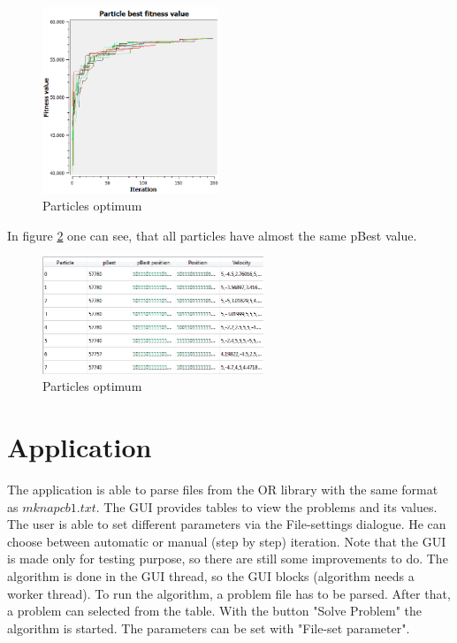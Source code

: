 \documentclass{article}
\begin{document}
\begin{figure}[H]
    \centering
    \includegraphics[width=200px]{images/p30_200it_p1_particles.PNG}
    \caption{Particles optimum}
    \label{fig-p30_200it_p1_particles}
\end{figure}

In figure \ref{fig-particles_optimum} one can see, that all particles have almost the same pBest value.

\begin{figure}[H]
    \centering
    \includegraphics[width=250px]{images/particles_optimum.PNG}
    \caption{Particles optimum}
    \label{fig-particles_optimum}
\end{figure}

\section{Application}
\label{lbl-app}
The application is able to parse files from the OR library with the same format as $mknapcb1.txt$. The GUI   provides tables to view the problems and its values. The user is able to set different parameters via the File-settings dialogue. He can choose between automatic or manual (step by step) iteration. Note that the GUI is made only for testing purpose, so there are still some improvements to do. The algorithm is done in the GUI thread, so the GUI blocks (algorithm needs a worker thread). To run the algorithm, a problem file has to be parsed. After that, a problem can selected from the table. With the button "Solve Problem" the algorithm is started. The parameters can be set with "File-set parameter".
\end{document}
